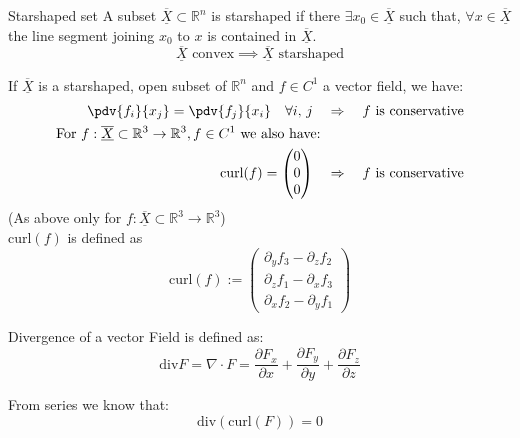 \documentclass[a4paper,fontsize = 10pt]{article}
\def\R{\mathbb{R}}
\def\X{\underline{\overline{X}}}
\begin{document}
\begin{subbox}{Starshaped set}
  A subset \(\X \subset \R^n\) is starshaped if there \(\exists x_0 \in \X\) such that, \(\forall x \in \X\) the line segment joining \(x_0\) to \(x\) is contained in \(\X\). 
  \[\X \text{ convex} \implies \X \text{ starshaped}\]
\end{subbox}
If \(\X\) is a starshaped, open subset of \(\R^n\) and \(f \in C^1\) a vector field, we have:
\begin{align*}
    \pdv{f_i}{x_j} = \pdv{f_j}{x_i} \quad \forall i,\, j
  \quad &\Rightarrow \quad \text{$f$ is conservative}\\
  \text{For $f: \X \subset \R^3 \to \R^3, f \in C^1$ we also have: }\\
  \text{curl}(f) = \begin{pmatrix}
    0\\0\\0
  \end{pmatrix}
  \quad &\Rightarrow \quad \text{$f$ is conservative}
\end{align*}
(As above only for $f: \X \subset \R^3 \to \R^3$) 
\\\(\text{curl}(f)\) is defined as
\[\text{curl}(f) := \begin{pmatrix}
  \partial_y f_3 - \partial_z f_2 \\
  \partial_z f_1 - \partial_x f_3 \\
  \partial_x f_2 - \partial_y f_1
\end{pmatrix}\]

Divergence of a vector Field is defined as: \\
\[ \text{div} F = \nabla \cdot F = \frac{\partial F_x}{\partial x} + \frac{\partial F_y}{\partial y} + \frac{\partial F_z}{\partial z}\]

From series we know that:
\[ \text{div}(\text{curl}(F)) = 0\]
\end{document}
